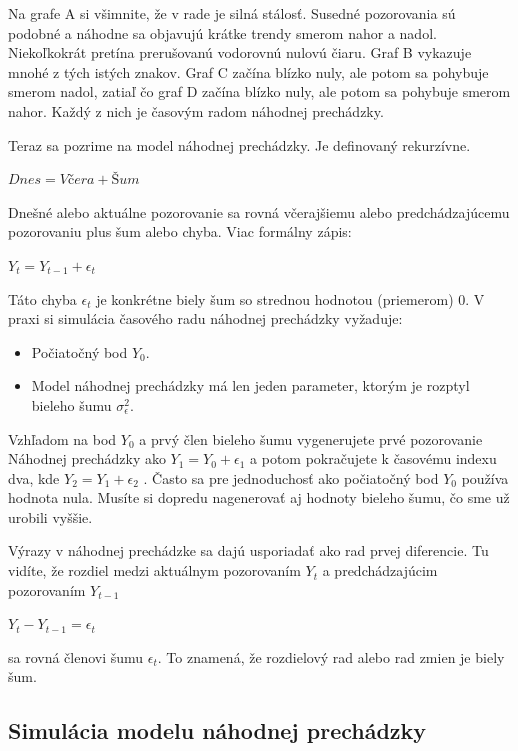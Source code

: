 \documentclass[
  letterpaper,
  DIV=11,
  numbers=noendperiod]{scrreprt}
\providecommand{\tightlist}{%
  \setlength{\itemsep}{0pt}\setlength{\parskip}{0pt}}\usepackage{longtable,booktabs,array}
\begin{document}
Na grafe A si všimnite, že v rade je silná stálosť. Susedné pozorovania
sú podobné a náhodne sa objavujú krátke trendy smerom nahor a nadol.
Niekoľkokrát pretína prerušovanú vodorovnú nulovú čiaru. Graf B vykazuje
mnohé z tých istých znakov. Graf C začína blízko nuly, ale potom sa
pohybuje smerom nadol, zatiaľ čo graf D začína blízko nuly, ale potom sa
pohybuje smerom nahor. Každý z nich je časovým radom náhodnej
prechádzky.

Teraz sa pozrime na model náhodnej prechádzky. Je definovaný rekurzívne.

\(Dnes = Včera + Šum\)

Dnešné alebo aktuálne pozorovanie sa rovná včerajšiemu alebo
predchádzajúcemu pozorovaniu plus šum alebo chyba. Viac formálny zápis:

\(Y_t = Y_{t-1} + \epsilon_t\)

Táto chyba \(\epsilon_t\) je konkrétne biely šum so strednou hodnotou
(priemerom) 0. V praxi si simulácia časového radu náhodnej prechádzky
vyžaduje:

\begin{itemize}
\tightlist
\item
  Počiatočný bod \(Y_0\).
\item
  Model náhodnej prechádzky má len jeden parameter, ktorým je rozptyl
  bieleho šumu \(\sigma^2_{\epsilon}\).
\end{itemize}

Vzhľadom na bod \(Y_0\) a prvý člen bieleho šumu vygenerujete prvé
pozorovanie Náhodnej prechádzky ako \(Y_1 = Y_0 + \epsilon_1\) a potom
pokračujete k časovému indexu dva, kde \(Y_2 = Y_1 + \epsilon_2\) .
Často sa pre jednoduchosť ako počiatočný bod \(Y_0\) používa hodnota
nula. Musíte si dopredu nagenerovať aj hodnoty bieleho šumu, čo sme už
urobili vyššie.

Výrazy v náhodnej prechádzke sa dajú usporiadať ako rad prvej
diferencie. Tu vidíte, že rozdiel medzi aktuálnym pozorovaním \(Y_t\) a
predchádzajúcim pozorovaním \(Y_{t-1}\)

\(Y_t - Y_{t-1} =  \epsilon_t\)

sa rovná členovi šumu \(\epsilon_t\). To znamená, že rozdielový rad
alebo rad zmien je biely šum.

\subsection{Simulácia modelu náhodnej
prechádzky}\label{simuluxe1cia-modelu-nuxe1hodnej-prechuxe1dzky}
\end{document}
